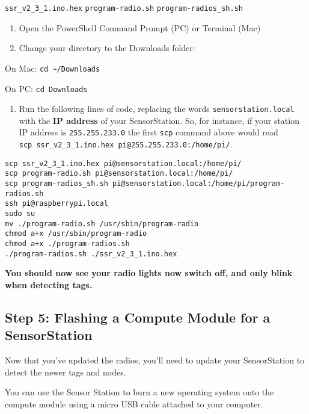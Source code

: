 \documentclass[
]{article}
\providecommand{\tightlist}{%
  \setlength{\itemsep}{0pt}\setlength{\parskip}{0pt}}
\begin{document}
\texttt{ssr\_v2\_3\_1.ino.hex} \texttt{program-radio.sh}
\texttt{program-radios\_sh.sh}

\begin{enumerate}
\def\labelenumi{\arabic{enumi}.}
\setcounter{enumi}{2}
\item
  Open the PowerShell Command Prompt (PC) or Terminal (Mac)
\item
  Change your directory to the Downloads folder:
\end{enumerate}

On Mac: \texttt{cd\ \textasciitilde{}/Downloads}

On PC: \texttt{cd\ Downloads}

\begin{enumerate}
\def\labelenumi{\arabic{enumi}.}
\setcounter{enumi}{4}
\tightlist
\item
  Run the following lines of code, replacing the words
  \texttt{sensorstation.local} with the \textbf{IP address} of your
  SensorStation. So, for instance, if your station IP address is
  \texttt{255.255.233.0} the first \texttt{scp} command above would read
  \texttt{scp\ ssr\_v2\_3\_1.ino.hex\ pi@255.255.233.0:/home/pi/}.
\end{enumerate}

\begin{verbatim}
scp ssr_v2_3_1.ino.hex pi@sensorstation.local:/home/pi/
scp program-radio.sh pi@sensorstation.local:/home/pi/
scp program-radios_sh.sh pi@sensorstation.local:/home/pi/program-radios.sh
ssh pi@raspberrypi.local 
sudo su
mv ./program-radio.sh /usr/sbin/program-radio
chmod a+x /usr/sbin/program-radio
chmod a+x ./program-radios.sh
./program-radios.sh ./ssr_v2_3_1.ino.hex
\end{verbatim}

\textbf{You should now see your radio lights now switch off, and only
blink when detecting tags.}

\hypertarget{step-5-flashing-a-compute-module-for-a-sensorstation}{%
\subsection{Step 5: Flashing a Compute Module for a
SensorStation}\label{step-5-flashing-a-compute-module-for-a-sensorstation}}

Now that you've updated the radios, you'll need to update your
SensorStation to detect the newer tags and nodes.

You can use the Sensor Station to burn a new operating system onto the
compute module using a micro USB cable attached to your computer.
\end{document}
